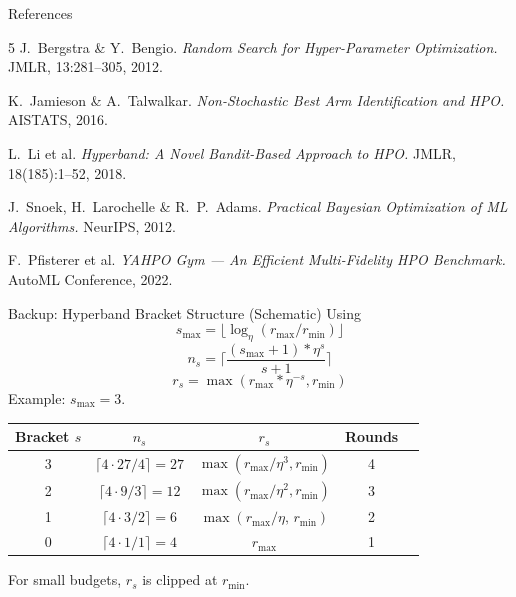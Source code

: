 \documentclass[t,english]{beamer}
\begin{document}
\appendix

\begin{frame}[allowframebreaks]{References}
  \begin{thebibliography}{5}
    \small
      J.~Bergstra \& Y.~Bengio.
      \textit{Random Search for Hyper-Parameter Optimization.}
      JMLR, 13:281--305, 2012.

      K.~Jamieson \& A.~Talwalkar.
      \textit{Non-Stochastic Best Arm Identification and HPO.}
      AISTATS, 2016.

      L.~Li et al.
      \textit{Hyperband: A Novel Bandit-Based Approach to HPO.}
      JMLR, 18(185):1--52, 2018.

      J.~Snoek, H.~Larochelle \& R.~P.~Adams.
      \textit{Practical Bayesian Optimization of ML Algorithms.}
      NeurIPS, 2012.

      F.~Pfisterer et al.
      \textit{YAHPO Gym — An Efficient Multi-Fidelity HPO Benchmark.}
      AutoML Conference, 2022.
  \end{thebibliography}
\end{frame}


\begin{frame}{Backup: Hyperband Bracket Structure (Schematic)}
  Using
          \[
            s_{\max} = \lfloor \log_\eta (r_{\max} / r_{\min}) \rfloor
          \]
          \[
            n_s = \lceil \frac{(s_{\max} + 1) * \eta^s}{s + 1} \rceil
          \]
          \[
            r_s = \max(r_{\max} * \eta^{-s}, r_{\min})
          \]
  Example: $s_{\max}=3$.

  \medskip
  \renewcommand{\tabcolsep}{5pt}
  \renewcommand{\arraystretch}{1.15}
  \begin{center}
  \begin{footnotesize}
  \begin{tabular}{ccccl}
    \toprule
    \textbf{Bracket} $s$ & $n_s$ & $r_s$ & Rounds \\
    \midrule
    3 & $\lceil 4{\cdot}27/4\rceil=27$ & $\max(r_{\max}/\eta^3, r_{\min})$ & 4 \\
    2 & $\lceil 4{\cdot}9/3\rceil=12$  & $\max(r_{\max}/\eta^2, r_{\min})$ & 3 \\
    1 & $\lceil 4{\cdot}3/2\rceil=6$   & $\max(r_{\max}/\eta,\, r_{\min})$ & 2 \\
    0 & $\lceil 4{\cdot}1/1\rceil=4$   & $r_{\max}$                        & 1 \\
    \bottomrule
  \end{tabular}
  \end{footnotesize}
  \end{center}
  \smallskip
  For small budgets, $r_s$ is clipped at $r_{\min}$.
\end{frame}
\end{document}
